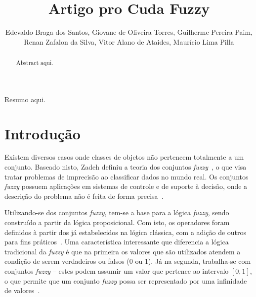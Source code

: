 \documentclass[12pt]{article}
\title{Artigo pro Cuda Fuzzy}
\author{Edevaldo Braga dos Santos\inst{1}, Giovane de Oliveira Torres\inst{1}, Guilherme Pereira Paim\inst{1},\\ Renan Zafalon da Silva\inst{1}, Vitor Alano de Ataides\inst{1}, Maurício Lima Pilla\inst{1}}
\begin{document}
\maketitle

\begin{abstract}

Abstract aqui.

\end{abstract}

\begin{resumo}

Resumo aqui.

\end{resumo}

\section{Introdução}


	Existem diversos casos onde classes de objetos não pertencem totalmente a um conjunto. Baseado nisto, Zadeh definiu a teoria dos conjuntos \textit{fuzzy}~\cite{zadeh:65}, o que visa tratar problemas de imprecisão ao classificar dados no mundo real. Os conjuntos \textit{fuzzy} possuem aplicações em sistemas de controle e de suporte à decisão, onde a descrição do problema não é feita de forma precisa~\cite{weber:03}.
	
	Utilizando-se dos conjuntos \textit{fuzzy}, tem-se a base para a lógica \textit{fuzzy}, sendo construído a partir da lógica proposicional. Com isto, os operadores foram definidos à partir dos já estabelecidos na lógica clássica, com a adição de outros para fins práticos~\cite{tanscheit:04}. Uma característica interessante que diferencia a lógica tradicional da \textit{fuzzy} é que na primeira os valores que são utilizados atendem a condição de serem verdadeiros ou falsos (0 ou 1). Já na segunda, trabalha-se com conjuntos \textit{fuzzy} -- estes podem assumir um valor que pertence ao intervalo $[0, 1]$, o que permite que um conjunto \textit{fuzzy} possa ser representado por uma infinidade de valores~\cite{klir:95}.	
	
\end{document}
